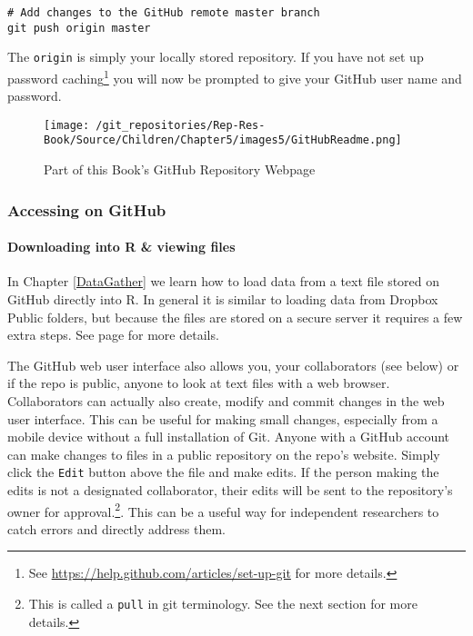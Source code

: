 \begin{knitrout}
\color{fgcolor}\begin{kframe}
\begin{verbatim}
# Add changes to the GitHub remote master branch
git push origin master
\end{verbatim}
\end{kframe}
\end{knitrout}


\noindent The \texttt{origin} is simply your locally stored repository. If you have not set up password caching\footnote{See \url{https://help.github.com/articles/set-up-git} for more details.} you will now be prompted to give your GitHub user name and password.

\begin{figure}[t]
    \caption{Part of this Book's GitHub Repository Webpage}
    \label{BookRepository}
    \begin{center}
    \texttt{[image: /git\_repositories/Rep-Res-Book/Source/Children/Chapter5/images5/GitHubReadme.png]}
    \end{center}
\end{figure}

\subsubsection{Accessing on GitHub}

\paragraph{Downloading into R \& viewing files}

In Chapter \ref{DataGather} we learn how to load data from a text file stored on GitHub directly into R. In general it is similar to loading data from Dropbox Public folders, but because the files are stored on a secure server it requires a few extra steps. See page \pageref{SecureDataDownload} for more details.

The GitHub web user interface also allows you, your collaborators (see below) or if the repo is public, anyone to look at text files with a web browser. Collaborators can actually also create, modify and commit changes in the web user interface. This can be useful for making small changes, especially from a mobile device without a full installation of Git. Anyone with a GitHub account can make changes to files in a public repository on the repo's website. Simply click the \texttt{Edit} button above the file and make edits. If the person making the edits is not a designated collaborator, their edits will be sent to the repository's owner for approval.\footnote{This is called a \texttt{pull} in git terminology. See the next section for more details.}. This can be a useful way for independent researchers to catch errors and directly address them.

